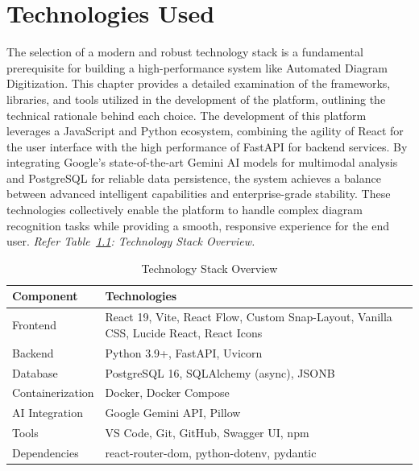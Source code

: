 \chapter{Technologies Used}
\label{ch:technologies}

The selection of a modern and robust technology stack is a 
fundamental prerequisite for building a high-performance system 
like Automated Diagram Digitization. This chapter provides a 
detailed examination of the frameworks, libraries, and tools 
utilized in the development of the platform, outlining the 
technical rationale behind each choice. The development of this platform leverages a JavaScript and Python ecosystem, combining the agility of React for the user 
interface with the high performance of FastAPI for backend 
services. By integrating Google's state-of-the-art Gemini AI 
models for multimodal analysis and PostgreSQL for reliable data 
persistence, the system achieves a balance between advanced 
intelligent capabilities and enterprise-grade stability. These 
technologies collectively enable the platform to handle complex 
diagram recognition tasks while providing a smooth, responsive 
experience for the end user.
\textit{Refer Table~\ref{tab:tech-stack}: Technology Stack Overview.}

\begin{table}[H]
\centering
\renewcommand{\arraystretch}{1.3}
\small
\begin{tabular}{|l|p{9cm}|}
    \hline
    \textbf{Component} & \textbf{Technologies} \\
    \hline
    \hline
    Frontend & React 19, Vite, React Flow, Custom Snap-Layout, 
               Vanilla CSS, Lucide React, React Icons \\
    \hline
    Backend & Python 3.9+, FastAPI, Uvicorn \\
    \hline
    Database & PostgreSQL 16, SQLAlchemy (async), JSONB \\
    \hline
    Containerization & Docker, Docker Compose \\
    \hline
    AI Integration & Google Gemini API, Pillow \\
    \hline
    Tools & VS Code, Git, GitHub, Swagger UI, npm \\
    \hline
    Dependencies & react-router-dom, python-dotenv, pydantic \\
    \hline
\end{tabular}
\caption{Technology Stack Overview}
\label{tab:tech-stack}
\end{table}

